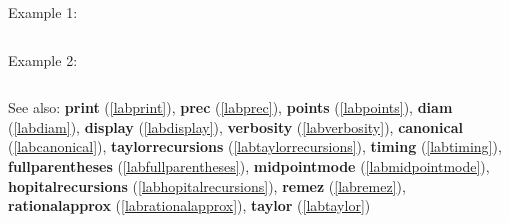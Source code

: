 \noindent Example 1: 
\begin{center}\begin{minipage}{15cm}\begin{Verbatim}[frame=single]
\end{Verbatim}
\end{minipage}\end{center}
\noindent Example 2: 
\begin{center}\begin{minipage}{15cm}\begin{Verbatim}[frame=single]
\end{Verbatim}
\end{minipage}\end{center}
See also: \textbf{print} (\ref{labprint}), \textbf{prec} (\ref{labprec}), \textbf{points} (\ref{labpoints}), \textbf{diam} (\ref{labdiam}), \textbf{display} (\ref{labdisplay}), \textbf{verbosity} (\ref{labverbosity}), \textbf{canonical} (\ref{labcanonical}), \textbf{taylorrecursions} (\ref{labtaylorrecursions}), \textbf{timing} (\ref{labtiming}), \textbf{fullparentheses} (\ref{labfullparentheses}), \textbf{midpointmode} (\ref{labmidpointmode}), \textbf{hopitalrecursions} (\ref{labhopitalrecursions}), \textbf{remez} (\ref{labremez}), \textbf{rationalapprox} (\ref{labrationalapprox}), \textbf{taylor} (\ref{labtaylor})
